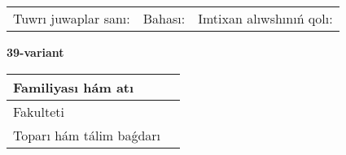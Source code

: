 \documentclass{article}
\begin{document}
\vspace{1cm}

\begin{tabular}{lll}
Tuwrı juwaplar sanı: \underline{\hspace{1.5cm}} & 
Bahası: \underline{\hspace{1.5cm}} & 
Imtixan alıwshınıń qolı: \underline{\hspace{2cm}} \\
\end{tabular}

\egroup

\newpage


\textbf{39-variant}\\

\bgroup
\def\arraystretch{1.6} %

\begin{tabular}{|m{5.7cm}|m{9.5cm}|}
\hline
Familiyası hám atı & \\
\hline
Fakulteti  & \\
\hline
Toparı hám tálim baǵdarı  & \\
\hline
\end{tabular}

\vspace{1cm}
\end{document}

